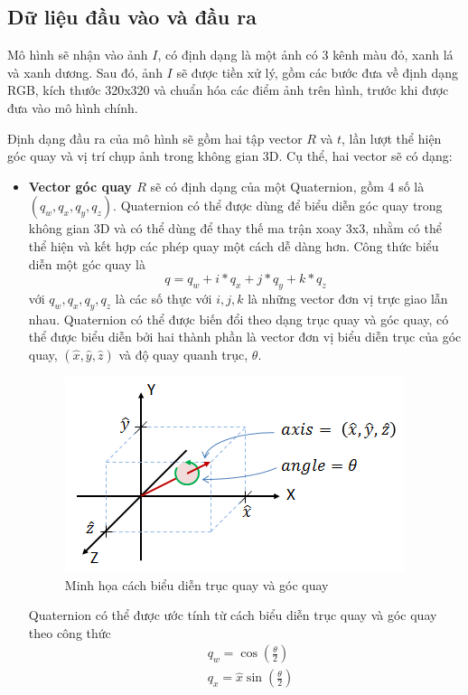 \subsection{Dữ liệu đầu vào và đầu ra}
Mô hình sẽ nhận vào ảnh $I$, có định dạng là một ảnh có 3 kênh màu đỏ, xanh lá và xanh dương. Sau đó, ảnh $I$ sẽ được tiền xử lý, gồm các bước đưa về định dạng RGB, kích thước 320x320 và chuẩn hóa các điểm ảnh trên hình, trước khi được đưa vào mô hình chính.

Định dạng đầu ra của mô hình sẽ gồm hai tập vector $R$ và $t$, lần lượt thể hiện góc quay và vị trí chụp ảnh trong không gian 3D. Cụ thể, hai vector sẽ có dạng:
\begin{itemize}
    \item \textbf{Vector góc quay $R$} sẽ có định dạng của một Quaternion, gồm 4 số là $(q_w,q_x,q_y,q_z)$. Quaternion có thể được dùng để biểu diễn góc quay trong không gian 3D và có thể dùng để thay thế ma trận xoay 3x3, nhằm có thể thể hiện và kết hợp các phép quay một cách dễ dàng hơn. Công thức biểu diễn một góc quay là 
    $$
    q=q_w + i*q_x + j*q_y + k*q_z
    $$
    với $q_w, q_x, q_y, q_z$ là các số thực với $i,j,k$ là những vector đơn vị trực giao lẫn nhau. Quaternion có thể được biến đổi theo dạng trục quay và góc quay, có thể được biểu diễn bởi hai thành phần là vector đơn vị biểu diễn trục của góc quay, $(\hat{x},\hat{y},\hat{z})$ và độ quay quanh trục, $\theta$. 
    \begin{figure}[H]
        \centering
        \includegraphics[scale=1]{pics/Proposal/axis-angle.png}
        \caption{Minh họa cách biểu diễn trục quay và góc quay \cite{quaternion}}
    \end{figure}
    Quaternion có thể được ước tính từ cách biểu diễn trục quay và góc quay theo công thức
    $$
    \begin{aligned}
        & q_w=\cos \left(\frac{\theta}{2}\right) \\
        & q_x=\hat{x} \sin \left(\frac{\theta}{2}\right) \\

\end{aligned}$$
\end{itemize}
